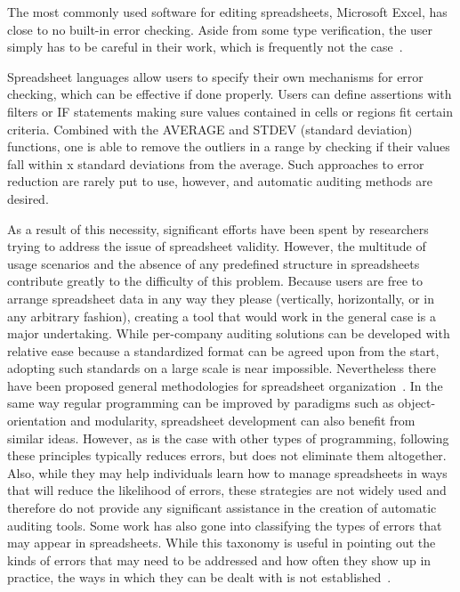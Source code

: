 
The most commonly used software for editing spreadsheets, Microsoft
Excel, has close to no built-in error checking. Aside from some type
verification, the user simply has to be careful in their work, which
is frequently not the case~\cite{FIXME}. %

Spreadsheet languages allow users to specify their own mechanisms for
error checking, which can be effective if done properly. Users can
define assertions with filters or IF statements making sure values
contained in cells or regions fit certain criteria. Combined with the
AVERAGE and STDEV (standard deviation) functions, one is able to
remove the outliers in a range by checking if their values fall within
x standard deviations from the average. Such approaches to error
reduction are rarely put to use, however, and automatic auditing
methods are desired.

As a result of this necessity, significant efforts have been spent by
researchers trying to address the issue of spreadsheet
validity. However, the multitude of usage scenarios and the absence of
any predefined structure in spreadsheets contribute greatly to the
difficulty of this problem. Because users are free to arrange
spreadsheet data in any way they please (vertically, horizontally, or
in any arbitrary fashion), creating a tool that would work in the
general case is a major undertaking. While per-company auditing
solutions can be developed with relative ease because a standardized
format can be agreed upon from the start, adopting such standards on a
large scale is near impossible. Nevertheless there have been proposed
general methodologies for spreadsheet organization~\cite{panko1998we}. %
 In the same
way regular programming can be improved by paradigms such as
object-orientation and modularity, spreadsheet development can also
benefit from similar ideas. However, as is the case with other types
of programming, following these principles typically reduces errors,
but does not eliminate them altogether. Also, while they may help
individuals learn how to manage spreadsheets in ways that will reduce
the likelihood of errors, these strategies are not widely used and
therefore do not provide any significant assistance in the creation of
automatic auditing tools.  Some work has also gone into classifying
the types of errors that may appear in spreadsheets. While this
taxonomy is useful in pointing out the kinds of errors that may need
to be addressed and how often they show up in practice, the ways in
which they can be dealt with is not established~\cite{rajalingham2005revised}. %

